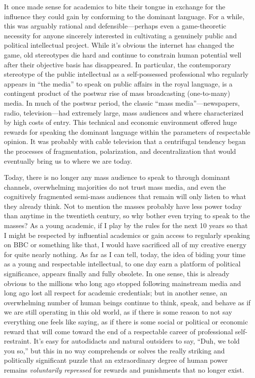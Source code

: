 \documentclass[a4paper,12pt,margin=.5in]{article}
\begin{document}
It once made sense for academics to bite their tongue in exchange for
the influence they could gain by conforming to the dominant language.
For a while, this was arguably rational and defensible---perhaps even a
game-theoretic necessity for anyone sincerely interested in cultivating
a genuinely public and political intellectual project. While it's
obvious the internet has changed the game, old stereotypes die hard and
continue to constrain human potential well after their objective basis
has disappeared. In particular, the contemporary stereotype of the
public intellectual as a self-possessed professional who regularly
appears in ``the media'' to speak on public affairs in the royal
language, is a contingent product of the postwar rise of mass
broadcasting (one-to-many) media. In much of the postwar period, the
classic ``mass media''---newspapers, radio, television---had extremely
large, mass audiences and where characterized by high costs of entry.
This technical and economic environment offered huge rewards for
speaking the dominant language within the parameters of respectable
opinion. It was probably with cable television that a centrifugal
tendency began the processes of fragmentation, polarization, and
decentralization that would eventually bring us to where we are today.

Today, there is no longer any mass audience to speak to through dominant
channels, overwhelming majorities do not trust mass media, and even the
cognitively fragmented semi-mass audiences that remain will only listen
to what they already think. Not to mention the masses probably have less
power today than anytime in the twentieth century, so why bother even
trying to speak to the masses? As a young academic, if I play by the
rules for the next 10 years so that I might be respected by influential
academics or gain access to regularly speaking on BBC or something like
that, I would have sacrificed all of my creative energy for quite nearly
nothing. As far as I can tell, today, the idea of biding your time as a
young and respectable intellectual, to one day earn a platform of
political significance, appears finally and fully obsolete. In one
sense, this is already obvious to the millions who long ago stopped
following mainstream media and long ago lost all respect for academic
credentials; but in another sense, an overwhelming number of human
beings continue to think, speak, and behave as if we are still operating
in this old world, as if there is some reason to not say everything one
feels like saying, as if there is some social or political or economic
reward that will come toward the end of a respectable career of
professional self-restraint. It's easy for autodidacts and natural
outsiders to say, ``Duh, we told you so,'' but this in no way
comprehends or solves the really striking and politically significant
puzzle that an extraordinary degree of human power remains
\emph{voluntarily repressed} for rewards and punishments that no longer
exist.
\end{document}
